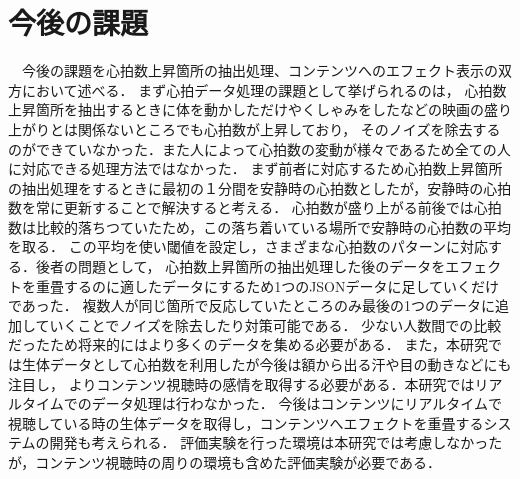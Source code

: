 \section{今後の課題}
　今後の課題を心拍数上昇箇所の抽出処理、コンテンツへのエフェクト表示の双方において述べる．
まず心拍データ処理の課題として挙げられるのは，
心拍数上昇箇所を抽出するときに体を動かしただけやくしゃみをしたなどの映画の盛り上がりとは関係ないところでも心拍数が上昇しており，
そのノイズを除去するのができていなかった．また人によって心拍数の変動が様々であるため全ての人に対応できる処理方法ではなかった．
まず前者に対応するため心拍数上昇箇所の抽出処理をするときに最初の１分間を安静時の心拍数としたが，安静時の心拍数を常に更新することで解決すると考える．
心拍数が盛り上がる前後では心拍数は比較的落ちつていたため，この落ち着いている場所で安静時の心拍数の平均を取る．
この平均を使い閾値を設定し，さまざまな心拍数のパターンに対応する．後者の問題として，
心拍数上昇箇所の抽出処理した後のデータをエフェクトを重畳するのに適したデータにするため1つのJSONデータに足していくだけであった．
複数人が同じ箇所で反応していたところのみ最後の1つのデータに追加していくことでノイズを除去したり対策可能である．
少ない人数間での比較だったため将来的にはより多くのデータを集める必要がある．
また，本研究では生体データとして心拍数を利用したが今後は額から出る汗や目の動きなどにも注目し，
よりコンテンツ視聴時の感情を取得する必要がある．本研究ではリアルタイムでのデータ処理は行わなかった．
今後はコンテンツにリアルタイムで視聴している時の生体データを取得し，コンテンツへエフェクトを重畳するシステムの開発も考えられる．
評価実験を行った環境は本研究では考慮しなかったが，コンテンツ視聴時の周りの環境も含めた評価実験が必要である．

